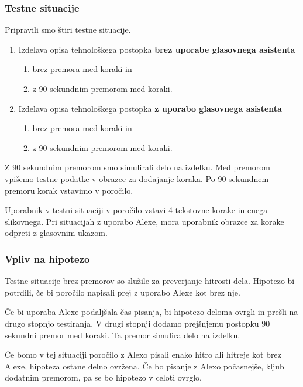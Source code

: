 \documentclass[a4paper, 12pt]{book}
\begin{document}
\subsubsection{Testne situacije}

Pripravili smo štiri testne situacije.

\begin{enumerate}
	\item Izdelava opisa tehnološkega postopka \textbf{brez uporabe glasovnega asistenta}
		\begin{enumerate}
			\item brez premora med koraki in
			\item z 90 sekundnim premorom med koraki.
		\end{enumerate}
	\item Izdelava opisa tehnološkega postopka \textbf{z uporabo glasovnega asistenta}
		\begin{enumerate}
			\item brez premora med koraki in
			\item z 90 sekundnim premorom med koraki.
		\end{enumerate}
\end{enumerate}

Z 90 sekundnim premorom smo simulirali delo na izdelku.
Med premorom vpišemo testne podatke v obrazec za dodajanje koraka.
Po 90 sekundnem premoru korak vstavimo v poročilo.

Uporabnik v testni situaciji v poročilo vstavi 4 tekstovne korake in enega slikovnega.
Pri situacijah z uporabo Alexe, mora uporabnik obrazce za korake odpreti z glasovnim ukazom.

\subsubsection{Vpliv na hipotezo}

Testne situacije brez premorov so služile za preverjanje hitrosti dela.
Hipotezo bi potrdili, če bi poročilo napisali prej z uporabo Alexe kot brez nje.

Če bi uporaba Alexe podaljšala čas pisanja, bi hipotezo deloma ovrgli in prešli na drugo stopnjo testiranja.
V drugi stopnji dodamo prejšnjemu postopku 90 sekundni premor med koraki.
Ta premor simulira delo na izdelku.

Če bomo v tej situaciji poročilo z Alexo pisali enako hitro ali hitreje kot brez Alexe, hipoteza ostane delno ovržena.
Če bo pisanje z Alexo počasnejše, kljub dodatnim premorom, pa se bo hipotezo v celoti ovrglo.
\end{document}

